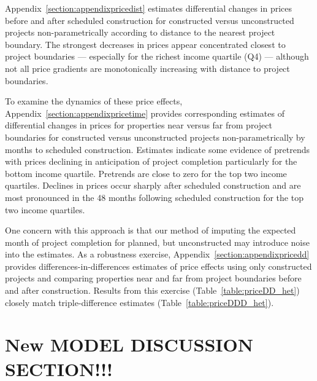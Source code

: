 \documentclass[12pt]{article}
\begin{document}
Appendix~\ref{section:appendixpricedist} estimates differential changes in prices before and after scheduled construction for constructed versus unconstructed projects non-parametrically according to distance to the nearest project boundary.  The strongest decreases in prices appear concentrated closest to project boundaries --- especially for the richest income quartile (Q4) --- although not all price gradients are monotonically increasing with distance to project boundaries.  

To examine the dynamics of these price effects, Appendix~\ref{section:appendixpricetime} provides corresponding estimates of differential changes in prices for properties near versus far from project boundaries for constructed versus unconstructed projects non-parametrically by months to scheduled construction.  Estimates indicate some evidence of pretrends with prices declining in anticipation of project completion particularly for the bottom income quartile.  Pretrends are close to zero for the top two income quartiles.  Declines in prices occur sharply after scheduled construction and are most pronounced in the 48 months following scheduled construction for the top two income quartiles.

One concern with this approach is that our method of imputing the expected month of project completion for planned, but unconstructed  may introduce noise into the estimates.  As a robustness exercise, Appendix~\ref{section:appendixpricedd} provides differences-in-differences estimates of price effects using only constructed projects and comparing properties near and far from project boundaries before and after construction.  Results from this exercise (Table~\ref{table:priceDD_het}) closely match triple-difference estimates (Table~\ref{table:priceDDD_het}).







\section{New MODEL DISCUSSION SECTION!!! }
\end{document}
